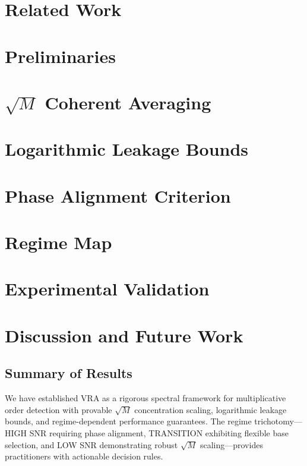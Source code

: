 \documentclass[11pt,twocolumn]{article}
\theoremstyle{definition}
\theoremstyle{remark}
\begin{document}
\section{Related Work}
\label{sec:related}


\section{Preliminaries}
\label{sec:prelim}


\section{$\sqrt{M}$ Coherent Averaging}
\label{sec:sqrt_m}


\section{Logarithmic Leakage Bounds}
\label{sec:leakage}


\section{Phase Alignment Criterion}
\label{sec:phase}


\section{Regime Map}
\label{sec:regime}


\section{Experimental Validation}
\label{sec:experiments}


\section{Discussion and Future Work}
\label{sec:discussion}

\subsection{Summary of Results}

We have established VRA as a rigorous spectral framework for multiplicative order detection with provable $\sqrt{M}$ concentration scaling, logarithmic leakage bounds, and regime-dependent performance guarantees. The regime trichotomy---HIGH SNR requiring phase alignment, TRANSITION exhibiting flexible base selection, and LOW SNR demonstrating robust $\sqrt{M}$ scaling---provides practitioners with actionable decision rules.
\end{document}
